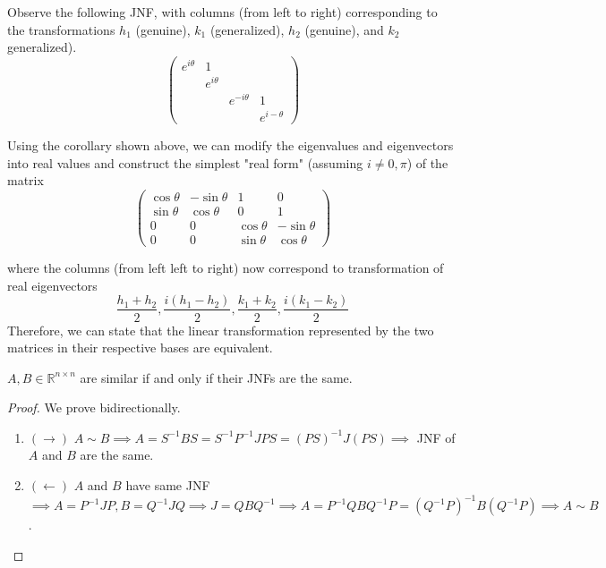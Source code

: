 	\begin{example}
	  \label{ex:2-rotations-in-r4}
		Observe the following JNF, with columns (from left to right) corresponding to the transformations $h_1$ (genuine), $k_1$ (generalized), $h_2$ (genuine), and $k_2$ generalized). 
		\begin{equation}
			\begin{pmatrix}
				e^{i \theta} & 1 & & \\
				& e^{i \theta} & & \\
				& & e^{-i \theta} & 1 \\
				& & & e^{i- \theta}
			\end{pmatrix}
		\end{equation}

		Using the corollary shown above, we can modify the eigenvalues and eigenvectors into real values and construct the simplest "real form" (assuming $i \neq 0, \pi$) of the matrix 
		\begin{equation}
			\begin{pmatrix}
				\cos{\theta} & - \sin{\theta} & 1 & 0 \\
				\sin{\theta} & \cos{\theta} & 0 & 1 \\
				0 & 0 & \cos{\theta} & - \sin{\theta} \\
				0 & 0 & \sin{\theta} & \cos{\theta}
			\end{pmatrix}
		\end{equation}

		where the columns (from left left to right) now correspond to transformation of real eigenvectors
		\begin{equation}
			\frac{h_1 + h_2}{2}, \frac{i(h_1 - h_2)}{2}, \frac{k_1 + k_2}{2}, \frac{i(k_1 - k_2)}{2}
		\end{equation}
		Therefore, we can state that the linear transformation represented by the two matrices in their respective bases are equivalent. 
	\end{example}

	\begin{theorem}
	  \label{thm:similarity-conditions}
		$A, B \in \mathbb{R}^{n \times n}$ are similar if and only if their JNFs are the same. 
  \end{theorem}
  \begin{proof}
		We prove bidirectionally. 
		\begin{enumerate}
		  \item $(\rightarrow)$ $A \sim B \implies A = S^{-1} B S = S^{-1} P^{-1} J P S = (PS)^{-1} J (PS) \implies$ JNF of $A$ and $B$ are the same. 
			\item $(\leftarrow)$ $A$ and $B$ have same JNF $\implies A = P^{-1} J P, B = Q^{-1} J Q \implies J = Q B Q^{-1} \implies A = P^{-1} Q B Q^{-1} P = (Q^{-1} P)^{-1} B (Q^{-1} P) \implies A \sim B$. 
		\end{enumerate}
  \end{proof}

